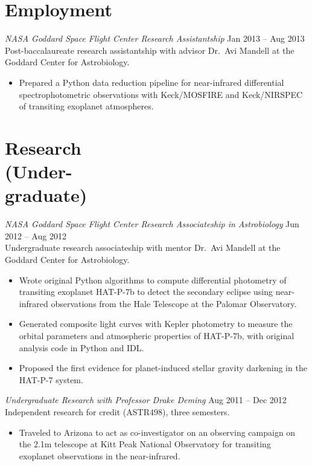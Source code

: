 \documentclass[margin]{res}
\begin{document}
\begin{resume}
\section{Employment} 

{\sl NASA Goddard Space Flight Center Research Assistantship} \hfill           Jan 2013 -- Aug 2013\\
Post-baccalaureate research assistantship with advisor Dr.\ Avi Mandell at the Goddard Center for Astrobiology.
\begin{itemize}%
\item Prepared a Python data reduction pipeline for near-infrared differential spectrophotometric observations with Keck/MOSFIRE and Keck/NIRSPEC of transiting exoplanet atmospheres.\\
\end{itemize}  

\section{Research \\(Under-\\graduate)} 
{\sl NASA Goddard Space Flight Center Research Associateship in Astrobiology} \hfill            Jun 2012 -- Aug 2012 \\
Undergraduate research associateship with mentor Dr.\ Avi Mandell at the Goddard Center for Astrobiology.
\begin{itemize}%
\item Wrote original Python algorithms to compute differential photometry of transiting exoplanet HAT-P-7b to detect the secondary eclipse using near-infrared observations from the Hale Telescope at the Palomar Observatory. 

\item Generated composite light curves with Kepler photometry to measure the orbital parameters and atmospheric properties of HAT-P-7b, with original analysis code in Python and IDL. 

\item Proposed the first evidence for planet-induced stellar gravity darkening in the HAT-P-7 system.
\end{itemize}  


{\sl Undergraduate Research with Professor Drake Deming} \hfill            Aug 2011 -- Dec 2012 \\
Independent research for credit (ASTR498), three semesters. 
\begin{itemize}
\item Traveled to Arizona to act as co-investigator on an observing campaign on the 2.1m telescope at Kitt Peak National Observatory for transiting exoplanet observations in the near-infrared. 


\end{itemize}
\end{resume}
\end{document}
